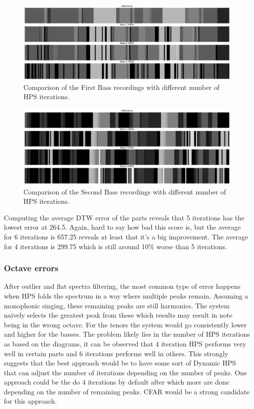 \begin{figure}[ht]
    \centering
    \includegraphics[width=\textwidth]{./images/hpsBass1.png}
    \caption{Comparison of the First Bass recordings with different number of HPS iterations. \label{fig:hpsBass1}}
\end{figure}


\begin{figure}[ht]
    \centering
    \includegraphics[width=\textwidth]{./images/hpsBass2.png}
    \caption{Comparison of the Second Bass recordings with different number of HPS iterations. \label{fig:hpsBass2}}
\end{figure}

Computing the average DTW error of the parts reveals that 5 iterations has the lowest error at 264.5. Again, hard to say how bad this score is, but the average for 6 iterations is 657.25 reveals at least that it's a big improvement. The average for 4 iterations is 299.75 which is still around 10\% worse than 5 iterations.

\subsubsection{Octave errors}
After outlier and flat spectra filtering, the most common type of error happens when HPS folds the spectrum in a way where multiple peaks remain. Assuming a monophonic singing, these remaining peaks are still harmonics. The system naively selects the greatest peak from these which results may result in note being in the wrong octave. For the tenors the system would go consistently lower and higher for the basses. The problem likely lies in the number of HPS iterations as based on the diagrams, it can be observed that 4 iteration HPS performs very well in certain parts and 6 iterations performs well in others. This strongly suggests that the best approach would be to have some sort of Dynamic HPS that can adjust the number of iterations depending on the number of peaks. One approach could be the do 4 iterations by default after which more are done depending on the number of remaining peaks. CFAR would be a strong candidate for this approach.


